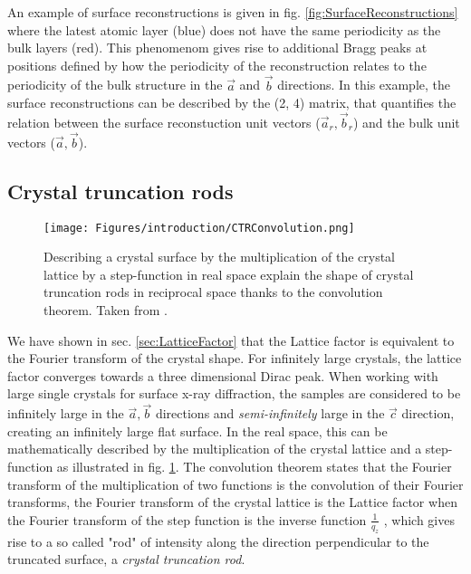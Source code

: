An example of surface reconstructions is given in fig. \ref{fig:SurfaceReconstructions} where the latest atomic layer (blue) does not have the same periodicity as the bulk layers (red).
This phenomenom gives rise to additional Bragg peaks at positions defined by how the periodicity of the reconstruction relates to the periodicity of the bulk structure in the $\vec{a}$ and $\vec{b}$ directions.
In this example, the surface reconstructions can be described by the (2, 4) matrix, that quantifies the relation between the surface reconstuction unit vectors ($\vec{a}_r, \vec{b}_r$) and the bulk unit vectors ($\vec{a}, \vec{b}$).

\subsection{Crystal truncation rods} \label{sec:CTR}

\begin{figure}[!htb]
    \centering
    \texttt{[image: Figures/introduction/CTRConvolution.png]}
    \caption{
    Describing a crystal surface by the multiplication of the crystal lattice by a step-function in real space explain the shape of crystal truncation rods in reciprocal space thanks to the convolution theorem.
    Taken from \cite{Willmott}.
    }
    \label{fig:CTRConvolution}
\end{figure}

We have shown in sec. \ref{sec:LatticeFactor} that the Lattice factor is equivalent to the Fourier transform of the crystal shape.
For infinitely large crystals, the lattice factor converges towards a three dimensional Dirac peak.
When working with large single crystals for surface x-ray diffraction, the samples are considered to be infinitely large in the $\vec{a}, \vec{b}$ directions and \textit{semi-infinitely} large in the $\vec{c}$ direction, creating an infinitely large flat surface.
In the real space, this can be mathematically described by the multiplication of the crystal lattice and a step-function as illustrated in fig. \ref{fig:CTRConvolution}.
The convolution theorem states that the Fourier transform of the multiplication of two functions is the convolution of their Fourier transforms, the Fourier transform of the crystal lattice is the Lattice factor when the Fourier transform of the step function is the inverse function $\frac{1}{q_z}$ \parencite{Andrews1985, Robinson1986}, which gives rise to a so called "rod" of intensity along the direction perpendicular to the truncated surface, a \textit{crystal truncation rod}.


